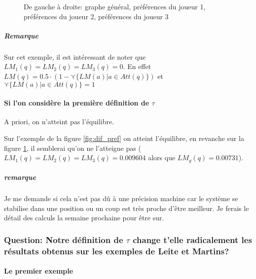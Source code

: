 \documentclass[12pt]{article}
\theoremstyle{defi}
\theoremstyle{not}
\theoremstyle{prob}
\begin{document}
\begin{figure}
            \caption{De gauche à droite: graphe général, préférences du joueur 1, préférences du joueur 2, préférences du joueur 3}
            \label{fig:trivial}
          \end{figure}

          \subparagraph{Remarque\\}
            Sur cet exemple, il est intéressant de noter que $LM_1(q) = LM_2(q) = LM_3(q) = 0$.
            En effet $LM(q) = 0.5 \cdot (1 - \curlyvee \{LM(a) | a\in Att(q)\})$ et $\curlyvee \{LM(a) | a\in Att(q)\} = 1$


        \paragraph{Si l'on considère la première définition de $\tau$\\}
          A priori, on n'atteint pas l'équilibre.

          Sur l'exemple de la figure \ref{fig:dif_pref} on atteint l'équilibre, en revanche sur la figure \ref{fig:trivial}, il semblerai qu'on ne l'atteigne pas ($LM_1(q) = LM_2(q) = LM_3(q) = 0.009604$ alors que $LM_g(q) = 0.00731$).

          \subparagraph{remarque\\} Je me demande si cela n'est pas dû à une précision machine car le système se stabilise dans une position ou un coup est très proche d'être meilleur.
            Je ferais le détail des calculs la semaine prochaine pour être sur.

      \subsubsection{Question: Notre définition de $\tau$ change t'elle radicalement les résultats obtenus sur les exemples de Leite et Martins?}

        \paragraph{Le premier exemple\\}
\end{document}
